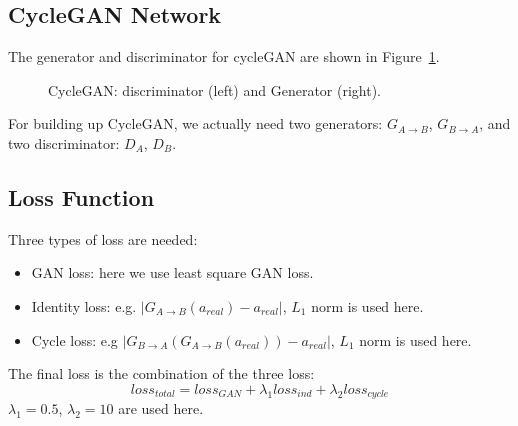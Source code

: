 \documentclass[runningheads]{llncs}
\begin{document}
\subsection{CycleGAN Network}
The generator and discriminator for cycleGAN are shown in Figure~\ref{fig7}.
\begin{figure}[ht]
	\centering
	\setlength{\fboxrule}{0.0pt}
	\caption{CycleGAN: discriminator (left) and Generator (right).}
	\label{fig7}
\end{figure}
For building up CycleGAN, we actually need two generators: $G_{A\to B}$, $G_{B\to A}$, and two discriminator: $D_{A}$, $D_{B}$. 

\subsection{Loss Function}
Three types of loss are needed:
\begin{itemize}
	\item GAN loss: here we use least square GAN loss.
	\item Identity loss: e.g. $|G_{A\to B}(a_{real})-a_{real}|$, $L_{1}$ norm is used here.
	\item Cycle loss: e.g $|G_{B\to A}(G_{A\to B}(a_{real}))-a_{real}|$, $L_{1}$ norm is used here.
\end{itemize}
The final loss is the combination of the three loss:
$$
loss_{total}=loss_{GAN}+\lambda_1 loss_{ind} + \lambda_2 loss_{cycle}
$$
$\lambda_1=0.5$, $\lambda_2=10$ are used here. 
\end{document}
